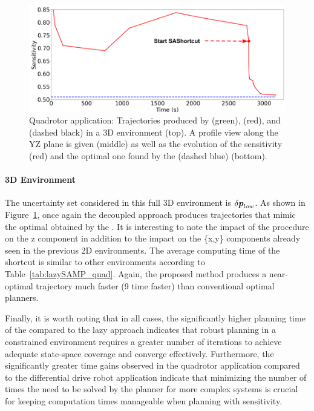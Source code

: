 \begin{figure}[h!]
\begin{minipage}{0.48\linewidth}
        \includegraphics[width=\linewidth]{figures/samp/3D_sensi.png}
    \end{minipage}
    \caption{Quadrotor application: Trajectories produced by  (green),  (red), and  (dashed black) in a 3D environment (top). 
    A profile view along the YZ plane is given (middle) as well as the evolution of the sensitivity (red) and the optimal one found by the  (dashed blue) (bottom).}
    \label{fig:3D}
\end{figure}

\paragraph{3D Environment} 

The uncertainty set considered in this full 3D environment is $\delta\boldsymbol{p}_{low}$.
As shown in Figure~\ref{fig:3D}, once again the decoupled approach produces trajectories that mimic the optimal obtained by the .
It is interesting to note the impact of the  procedure on the z component in addition to the impact on the \{x,y\} components already seen in the previous 2D environments.
The average computing time of the shortcut is similar to other environments according to Table~\ref{tab:lazySAMP_quad}.
Again, the proposed method produces a near-optimal trajectory much faster (9 time faster) than conventional optimal planners.

Finally, it is worth noting that in all cases, the significantly higher planning time of the  compared to the lazy approach indicates that robust planning in a constrained environment requires a greater number of iterations to achieve adequate state-space coverage and converge effectively.
Furthermore, the significantly greater time gains observed in the quadrotor application compared to the differential drive robot application indicate that minimizing the number of times the  need to be solved by the planner for more complex systems is crucial for keeping computation times manageable when planning with sensitivity.

